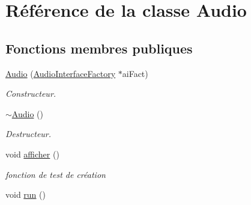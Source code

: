 \hypertarget{classAudio}{\section{Référence de la classe Audio}
\label{classAudio}
}
\subsection*{Fonctions membres publiques}
\begin{DoxyCompactItemize}
\item 
\hyperlink{classAudio_acce28b8dbf321b14405f2ccd244dc4b5}{Audio} (\hyperlink{classAudioInterfaceFactory}{Audio\+Interface\+Factory} $\ast$ai\+Fact)
\begin{DoxyCompactList}\small\item\em Constructeur. \end{DoxyCompactList}\item 
\hypertarget{classAudio_ae8f54deecb5f48511aaab469e80294d6}{\hyperlink{classAudio_ae8f54deecb5f48511aaab469e80294d6}{$\sim$\+Audio} ()}\label{classAudio_ae8f54deecb5f48511aaab469e80294d6}

\begin{DoxyCompactList}\small\item\em Destructeur. \end{DoxyCompactList}\item 
\hypertarget{classAudio_ae2e9ae249650dbce7d4a3511dda53a55}{void \hyperlink{classAudio_ae2e9ae249650dbce7d4a3511dda53a55}{afficher} ()}\label{classAudio_ae2e9ae249650dbce7d4a3511dda53a55}

\begin{DoxyCompactList}\small\item\em fonction de test de création \end{DoxyCompactList}\item 
\hypertarget{classAudio_ab4cb3dc5718af3ea91d12b8b54038741}{void \hyperlink{classAudio_ab4cb3dc5718af3ea91d12b8b54038741}{run} ()}\label{classAudio_ab4cb3dc5718af3ea91d12b8b54038741}


\end{DoxyCompactItemize}
